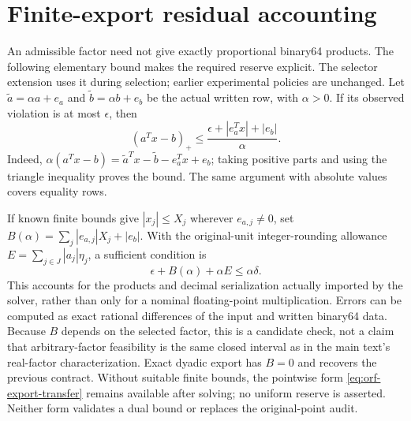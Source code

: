 \section{Finite-export residual accounting}
\label{sec:orf-export-errors}
An admissible factor need not give exactly proportional binary64 products.
The following elementary bound makes the required reserve explicit. The selector
extension uses it during selection; earlier experimental policies are unchanged. Let
$\widetilde a=\alpha a+e_a$ and $\widetilde b=\alpha b+e_b$ be the actual
written row, with $\alpha>0$. If its observed violation is at most $\epsilon$,
then
\begin{equation}\label{eq:orf-export-transfer}
 (a^Tx-b)_+\le
 \frac{\epsilon+|e_a^Tx|+|e_b|}{\alpha}.
\end{equation}
Indeed, $\alpha(a^Tx-b)=\widetilde a^Tx-\widetilde b-e_a^Tx+e_b$;
taking positive parts and using the triangle inequality proves the bound.
The same argument with absolute values covers equality rows.

If known finite bounds give $|x_j|\le X_j$ wherever $e_{a,j}\ne0$, set
$B(\alpha)=\sum_j|e_{a,j}|X_j+|e_b|$. With the original-unit integer-rounding
allowance $E=\sum_{j\in J}|a_j|\eta_j$, a sufficient condition is
\begin{equation}\label{eq:orf-export-contract}
 \epsilon+B(\alpha)+\alpha E\le\alpha\delta.
\end{equation}
This accounts for the products and decimal serialization actually imported by
the solver, rather than only for a nominal floating-point multiplication.
Errors can be computed as exact rational differences of the input and written
binary64 data. Because $B$ depends on the selected factor, this is a candidate
check, not a claim that arbitrary-factor feasibility is the same closed
interval as in the main text's real-factor characterization. Exact dyadic export has $B=0$ and recovers
the previous contract. Without suitable finite bounds, the pointwise form
\eqref{eq:orf-export-transfer} remains available after solving; no uniform
reserve is asserted. Neither form validates a dual bound or replaces the
original-point audit.
